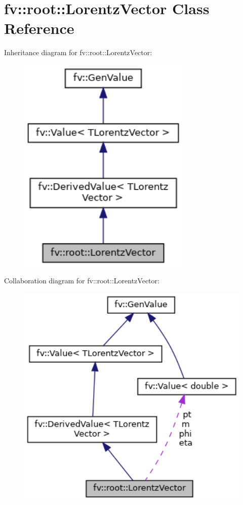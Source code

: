 \hypertarget{classfv_1_1root_1_1LorentzVector}{}\section{fv\+:\+:root\+:\+:Lorentz\+Vector Class Reference}
\label{classfv_1_1root_1_1LorentzVector}


Inheritance diagram for fv\+:\+:root\+:\+:Lorentz\+Vector\+:
\nopagebreak
\begin{figure}[H]
\begin{center}
\leavevmode
\includegraphics[width=234pt]{classfv_1_1root_1_1LorentzVector__inherit__graph}
\end{center}
\end{figure}


Collaboration diagram for fv\+:\+:root\+:\+:Lorentz\+Vector\+:
\nopagebreak
\begin{figure}[H]
\begin{center}
\leavevmode
\includegraphics[width=322pt]{classfv_1_1root_1_1LorentzVector__coll__graph}
\end{center}
\end{figure}
